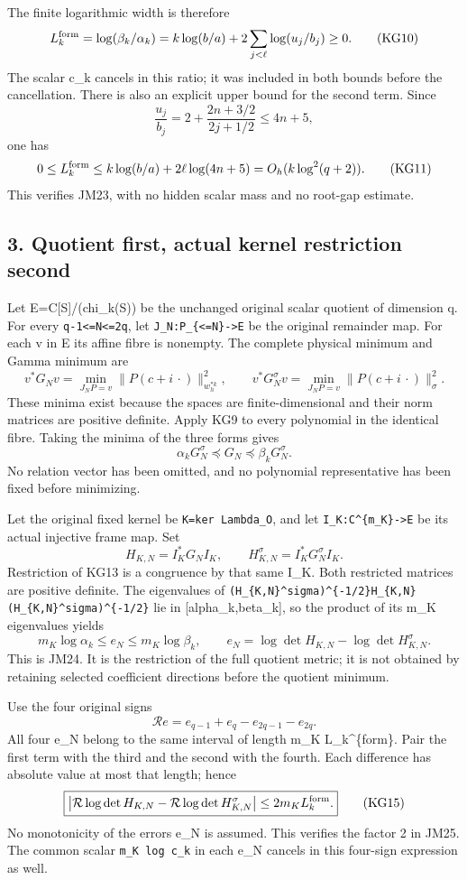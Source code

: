 \documentclass[11pt]{article}
\begin{document}
The finite logarithmic width is therefore \[
L_k^{\rm form}=\log(\beta_k/\alpha_k)
=k\log(b/a)+2\sum_{j<\ell}\log(u_j/b_j)\ge0.
\tag{KG10}
\] The scalar c\_k cancels in this ratio; it was included in both bounds before the cancellation. There is also an explicit upper bound for the second term. Since \[
\frac{u_j}{b_j}=2+\frac{2n+3/2}{2j+1/2}\le4n+5,
\] one has \[
0\le L_k^{\rm form}\le k\log(b/a)+2\ell\log(4n+5)
=O_h(k\log^2(q+2)).
\tag{KG11}
\] This verifies JM23, with no hidden scalar mass and no root-gap estimate.

\subsection{3. Quotient first, actual kernel restriction second}\label{mrkg:quotient-first-actual-kernel-restriction-second}

Let E=C{[}S{]}/(chi\_k(S)) be the unchanged original scalar quotient of dimension q. For every \texttt{q-1\textless{}=N\textless{}=2q}, let \texttt{J\_N:P\_\{\textless{}=N\}-\textgreater{}E} be the original remainder map. For each v in E its affine fibre is nonempty. The complete physical minimum and Gamma minimum are \[
v^*G_Nv=\min_{J_NP=v}\|P(c+i\,\cdot)\|_{w_h^{*k}}^2,
\qquad
v^*G_N^\sigma v=\min_{J_NP=v}\|P(c+i\,\cdot)\|_\sigma^2.
\tag{KG12}
\] These minima exist because the spaces are finite-dimensional and their norm matrices are positive definite. Apply KG9 to every polynomial in the identical fibre. Taking the minima of the three forms gives \[
\alpha_kG_N^\sigma\preceq G_N\preceq\beta_kG_N^\sigma.
\tag{KG13}
\] No relation vector has been omitted, and no polynomial representative has been fixed before minimizing.

Let the original fixed kernel be \texttt{K=ker\ Lambda\_O}, and let \texttt{I\_K:C\^{}\{m\_K\}-\textgreater{}E} be its actual injective frame map. Set \[
H_{K,N}=I_K^*G_NI_K,\qquad
H_{K,N}^\sigma=I_K^*G_N^\sigma I_K.
\] Restriction of KG13 is a congruence by that same I\_K. Both restricted matrices are positive definite. The eigenvalues of \texttt{(H\_\{K,N\}\^{}sigma)\^{}\{-1/2\}H\_\{K,N\}(H\_\{K,N\}\^{}sigma)\^{}\{-1/2\}} lie in {[}alpha\_k,beta\_k{]}, so the product of its m\_K eigenvalues yields \[
m_K\log\alpha_k\le e_N\le m_K\log\beta_k,\qquad
e_N=\log\det H_{K,N}-\log\det H_{K,N}^\sigma.
\tag{KG14}
\] This is JM24. It is the restriction of the full quotient metric; it is not obtained by retaining selected coefficient directions before the quotient minimum.

Use the four original signs \[
\mathcal Re=e_{q-1}+e_q-e_{2q-1}-e_{2q}.
\] All four e\_N belong to the same interval of length m\_K L\_k\^{}\{form\}. Pair the first term with the third and the second with the fourth. Each difference has absolute value at most that length; hence \[
\boxed{\left|\mathcal R\log\det H_{K,N}
-\mathcal R\log\det H_{K,N}^\sigma\right|
\le2m_KL_k^{\rm form}.}
\tag{KG15}
\] No monotonicity of the errors e\_N is assumed. This verifies the factor 2 in JM25. The common scalar \texttt{m\_K\ log\ c\_k} in each e\_N cancels in this four-sign expression as well.
\end{document}
